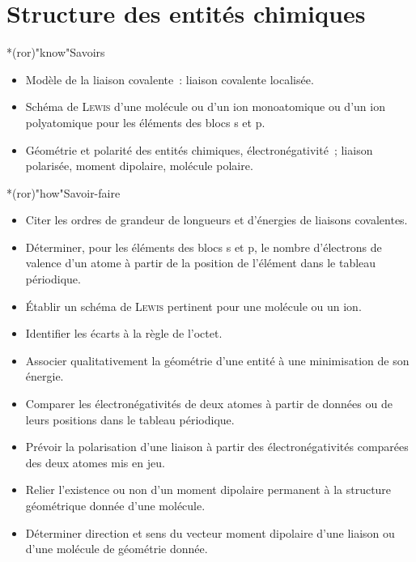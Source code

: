 \documentclass[../../main/main.tex]{subfiles}
\begin{document}
\setcounter{chapter}{0}

\chapter{Structure des entit\'es chimiques}

\vspace{-15pt}
\begin{prgm}
	\footnotesize
	\begin{tcb}*(ror)"know"{Savoirs}
		\begin{itemize}
			\item Modèle de la liaison covalente~: liaison covalente localisée.
			\item Schéma de \textsc{Lewis} d'une molécule ou d'un ion monoatomique ou
			      d'un ion polyatomique pour les éléments des blocs s et p.
			\item Géométrie et polarité des entités chimiques, électronégativité~;
			      liaison polarisée, moment dipolaire, molécule polaire.
		\end{itemize}
	\end{tcb}
	\begin{tcb}*(ror)"how"{Savoir-faire}
		\begin{itemize}
			\item Citer les ordres de grandeur de longueurs et d'énergies de liaisons
			      covalentes.
			\item Déterminer, pour les éléments des blocs s et p, le nombre
			      d'électrons de valence d'un atome à partir de la position de l'élément
			      dans le tableau périodique.
			\item Établir un schéma de \textsc{Lewis} pertinent pour une molécule ou
			      un ion.
			\item Identifier les écarts à la règle de l'octet.
			\item Associer qualitativement la géométrie d'une entité à une
			      minimisation de son énergie.
			\item Comparer les électronégativités de deux atomes à partir de données
			      ou de leurs positions dans le tableau périodique.
			\item Prévoir la polarisation d'une liaison à partir des
			      électronégativités comparées des deux atomes mis en jeu.
			\item Relier l'existence ou non d'un moment dipolaire permanent à la
			      structure géométrique donnée d'une molécule.
			\item Déterminer direction et sens du vecteur moment dipolaire d'une
			      liaison ou d'une molécule de géométrie donnée.
		\end{itemize}
	\end{tcb}
\end{prgm}
\end{document}
